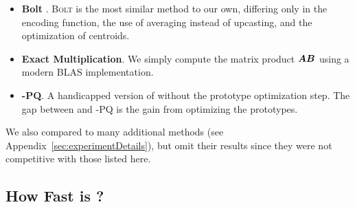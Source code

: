 \begin{itemize}
    \item \textbf{Bolt} \cite{bolt}. \textsc{Bolt}
    is the most similar method to our own, differing only in the encoding function, the use of averaging instead of upcasting, and the optimization of centroids. %
    \item \textbf{Exact Multiplication}. We simply compute the matrix product $\bm{A}\bm{B}$ using a modern BLAS implementation.
    \item \textbf{\ours-PQ}. A handicapped version of \oursp without the prototype optimization step. The gap between \oursp and \ours-PQ is the gain from optimizing the prototypes.
\end{itemize}
\vspace{-2mm}
We also compared to many additional methods (see Appendix~\ref{sec:experimentDetails}), but omit their results since they were not competitive with those listed here.

\vspace{-1mm}
\subsection{How Fast is \ours?}
\vspace{-.5mm}

